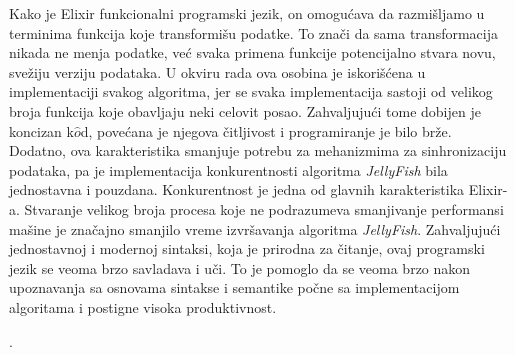 \documentclass[12pt,oneside]{memoir}
\begin{document}
Kako je Elixir funkcionalni programski jezik, on omogućava da razmišljamo u terminima funkcija koje transformišu podatke. To znači da sama transformacija nikada ne menja podatke, već svaka primena funkcije potencijalno stvara novu, svežiju verziju podataka. U okviru rada ova osobina je iskorišćena u implementaciji svakog algoritma, jer se svaka implementacija sastoji od velikog broja funkcija koje obavljaju neki celovit posao.  Zahvaljujući tome dobijen je koncizan k$\hat{o}$d, povećana je njegova čitljivost i programiranje je bilo brže. Dodatno, ova karakteristika smanjuje potrebu za mehanizmima za sinhronizaciju podataka, pa je implementacija konkurentnosti algoritma \textit{JellyFish} bila jednostavna i pouzdana. Konkurentnost je jedna od glavnih karakteristika Elixir-a. Stvaranje velikog broja procesa koje ne podrazumeva smanjivanje performansi mašine je značajno smanjilo vreme izvršavanja algoritma \textit{JellyFish}. Zahvaljujući jednostavnoj i modernoj sintaksi, koja je prirodna za čitanje, ovaj programski jezik se veoma brzo savladava i uči. To je pomoglo da se veoma brzo nakon upoznavanja sa osnovama sintakse i semantike počne sa implementacijom algoritama i postigne visoka produktivnost.

 



.%

\literatura
\end{document}
